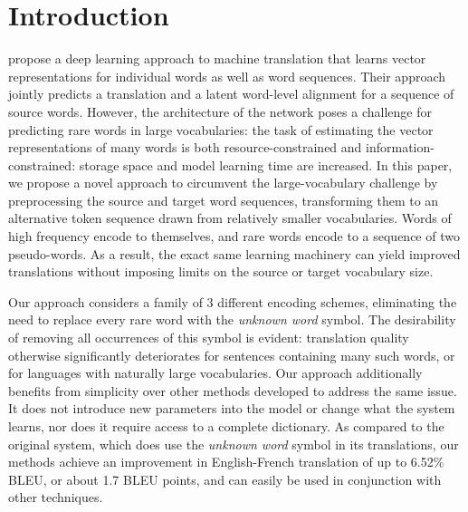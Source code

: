 \section{Introduction}
\label{sec:intro}

 propose a deep learning approach to
machine translation that learns vector representations for individual words as
well as word sequences. Their approach jointly predicts a translation and a
latent word-level alignment for a sequence of source words. However, the architecture of
the network poses a challenge for predicting rare words in large
vocabularies: the task of estimating the vector representations of many words
is both resource-constrained and information-constrained: storage space and model learning time
are increased. In this paper, we
propose a novel approach to circumvent the large-vocabulary challenge by preprocessing the source
and target word sequences, transforming them to an alternative token sequence drawn from
relatively smaller vocabularies. Words of high frequency encode to themselves, and rare
words encode to a sequence of two pseudo-words. As a result, the exact same learning machinery
can yield improved translations without imposing limits on the source or target
vocabulary size.

Our approach considers a family of 3 different encoding schemes, eliminating the need to replace every rare word with the
\emph{unknown word} symbol. The desirability of removing all occurrences of this symbol is evident: translation
quality otherwise significantly deteriorates for sentences containing many such words, or for
languages with naturally large vocabularies. Our approach additionally benefits from simplicity over
other methods developed to address the same issue. It does not introduce
new parameters into the model or change what the system learns, nor does it require access to a complete dictionary.
 As compared to the original system, which does use the \emph{unknown word} symbol in
its translations, our methods achieve an improvement in English-French translation of up to 6.52\% BLEU, or about 1.7 BLEU points,
and can easily be used in conjunction with other techniques.